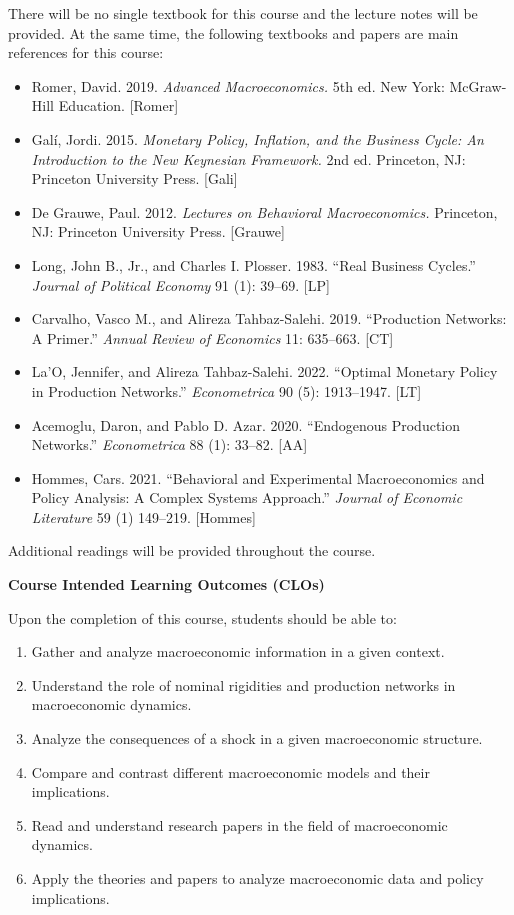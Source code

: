 \documentclass[12pt]{article}
\begin{document}
There will be no single textbook for this course and the lecture notes will be provided. At the same time, the following textbooks and papers are main references for this course:
\begin{itemize}
    \item Romer, David. 2019. \textit{Advanced Macroeconomics.} 5th ed. New York: McGraw-Hill Education. [Romer]
    \item Galí, Jordi. 2015. \textit{Monetary Policy, Inflation, and the Business Cycle: An Introduction to the New Keynesian Framework.} 2nd ed. Princeton, NJ: Princeton University Press. [Gali]
    \item De Grauwe, Paul. 2012. \textit{Lectures on Behavioral Macroeconomics.} Princeton, NJ: Princeton University Press. [Grauwe]
    \item Long, John B., Jr., and Charles I. Plosser. 1983. ``Real Business Cycles.'' \textit{Journal of Political Economy} 91 (1): 39–69. [LP]
    \item Carvalho, Vasco M., and Alireza Tahbaz-Salehi. 2019. ``Production Networks: A Primer.'' \textit{Annual Review of Economics} 11: 635–663. [CT]
    \item La’O, Jennifer, and Alireza Tahbaz-Salehi. 2022. ``Optimal Monetary Policy in Production Networks.'' \textit{Econometrica} 90 (5): 1913–1947. [LT]
    \item Acemoglu, Daron, and Pablo D. Azar. 2020. ``Endogenous Production Networks.'' \textit{Econometrica} 88 (1): 33–82. [AA]
    \item Hommes, Cars. 2021. ``Behavioral and Experimental Macroeconomics and Policy Analysis: A Complex Systems Approach.'' \textit{Journal of Economic Literature} 59 (1) 149–219. [Hommes]
\end{itemize}
Additional readings will be provided throughout the course.



\newpage
\noindent \textbf{Course Intended Learning Outcomes (CLOs)}

Upon the completion of this course, students should be able to:
\begin{enumerate}[label=CLO \arabic*:, leftmargin=*, widest=CLO 6:]
    \item Gather and analyze macroeconomic information in a given context. 
    \item Understand the role of nominal rigidities and production networks in macroeconomic dynamics.
    \item Analyze the consequences of a shock in a given macroeconomic structure.
    \item Compare and contrast different macroeconomic models and their implications.
    \item Read and understand research papers in the field of macroeconomic dynamics.
    \item Apply the theories and papers to analyze macroeconomic data and policy implications.
\end{enumerate}
\end{document}

